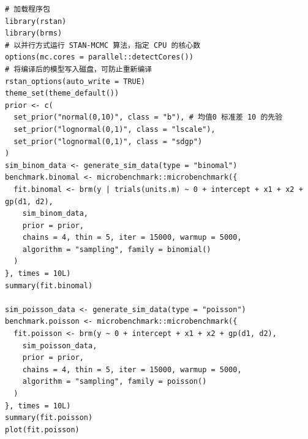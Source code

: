 \documentclass[12pt,a4paper,UTF8,twoside]{book}
\theoremstyle{definition}
\theoremstyle{definition}
\theoremstyle{definition}
\theoremstyle{remark}
\begin{document}
\begin{verbatim}
# 加载程序包
library(rstan)
library(brms)
# 以并行方式运行 STAN-MCMC 算法，指定 CPU 的核心数
options(mc.cores = parallel::detectCores())
# 将编译后的模型写入磁盘，可防止重新编译
rstan_options(auto_write = TRUE)
theme_set(theme_default())
prior <- c(
  set_prior("normal(0,10)", class = "b"), # 均值0 标准差 10 的先验
  set_prior("lognormal(0,1)", class = "lscale"),
  set_prior("lognormal(0,1)", class = "sdgp")
)
sim_binom_data <- generate_sim_data(type = "binomal")
benchmark.binomal <- microbenchmark::microbenchmark({
  fit.binomal <- brm(y | trials(units.m) ~ 0 + intercept + x1 + x2 + gp(d1, d2),
    sim_binom_data,
    prior = prior,
    chains = 4, thin = 5, iter = 15000, warmup = 5000,
    algorithm = "sampling", family = binomial()
  )
}, times = 10L)
summary(fit.binomal)

sim_poisson_data <- generate_sim_data(type = "poisson")
benchmark.poisson <- microbenchmark::microbenchmark({
  fit.poisson <- brm(y ~ 0 + intercept + x1 + x2 + gp(d1, d2),
    sim_poisson_data,
    prior = prior,
    chains = 4, thin = 5, iter = 15000, warmup = 5000, 
    algorithm = "sampling", family = poisson()
  )
}, times = 10L)
summary(fit.poisson)
plot(fit.poisson)
\end{verbatim}


\backmatter
\end{document}
